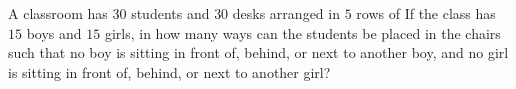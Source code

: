A classroom has $30$ students and $30$ desks arranged in $5$ rows of  If the class has $15$ boys and $15$ girls, in how many ways can the students be placed in the chairs such that no boy is sitting in front of, behind, or next to another boy, and no girl is sitting in front of, behind, or next to another girl?